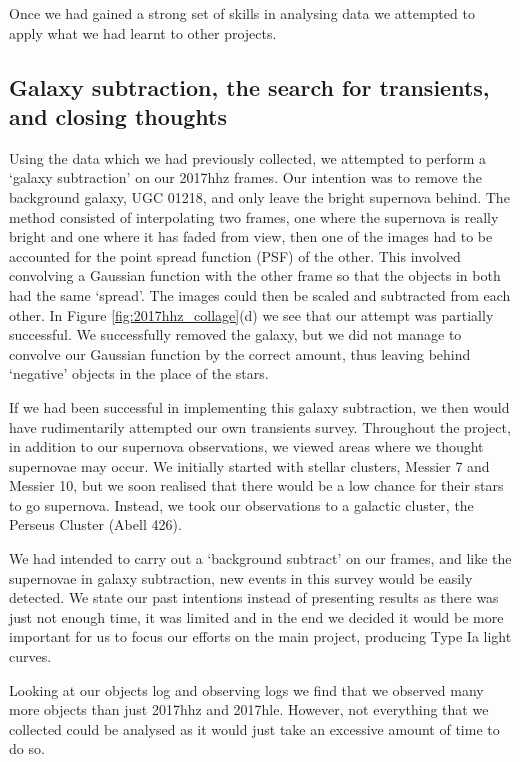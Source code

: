 \documentclass[twocolumn]{revtex4}
\begin{document}
Once we had gained a strong set of skills in analysing data we attempted to apply what we had learnt to other projects. 

\vspace{-3ex}
\subsection{Galaxy subtraction, the search for transients, and closing thoughts}
\vspace{-2ex}

Using the data which we had previously collected, we attempted to perform a `galaxy subtraction' on our 2017hhz frames. Our intention was to remove the background galaxy, UGC 01218, and only leave the bright supernova behind. The method consisted of interpolating two frames, one where the supernova is really bright and one where it has faded from view, then one of the images had to be accounted for the point spread function (PSF) of the other. This involved convolving a Gaussian function with the other frame so that the objects in both had the same `spread'. The images could then be scaled and subtracted from each other. In Figure \ref{fig:2017hhz_collage}(d) we see that our attempt was partially successful. We successfully removed the galaxy, but we did not manage to convolve our Gaussian function by the correct amount, thus leaving behind `negative' objects in the place of the stars. 

If we had been successful in implementing this galaxy subtraction, we then would have rudimentarily attempted our own transients survey. Throughout the project, in addition to our supernova observations, we viewed areas where we thought supernovae may occur. We initially started with stellar clusters, Messier 7 and Messier 10, but we soon realised that there would be a low chance for their stars to go supernova. Instead, we took our observations to a galactic cluster, the Perseus Cluster (Abell 426). 

We had intended to carry out a `background subtract' on our frames, and like the supernovae in galaxy subtraction, new events in this survey would be easily detected. We state our past intentions instead of presenting results as there was just not enough time, it was limited and in the end we decided it would be more important for us to focus our efforts on the main project, producing Type Ia light curves. 

Looking at our objects log and observing logs we find that we observed many more objects than just 2017hhz and 2017hle. However, not everything that we collected could be analysed as it would just take an excessive amount of time to do so. 
\end{document}
